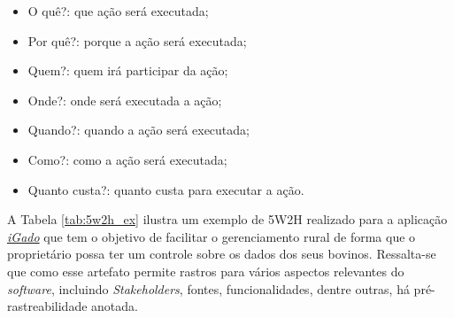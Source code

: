 \begin{itemize}
    \item O quê?: que ação será executada;
    \item Por quê?: porque a ação será executada;
    \item Quem?: quem irá participar da ação;
    \item Onde?: onde será executada a ação;
    \item Quando?: quando a ação será executada;
    \item Como?: como a ação será executada;
    \item Quanto custa?: quanto custa para executar a ação.
\end{itemize}

A Tabela \ref{tab:5w2h_ex} ilustra um exemplo de 5W2H realizado para a aplicação \href{https://unbarqdsw.github.io/2020.1_G13_iGado/#/}{\textit{iGado}} que tem o objetivo de facilitar o gerenciamento rural de forma que o proprietário possa ter um controle sobre os dados dos seus bovinos. Ressalta-se que como esse artefato permite rastros para vários aspectos relevantes do \textit{software}, incluindo \textit{Stakeholders}, fontes, funcionalidades, dentre outras, há pré-rastreabilidade anotada.


